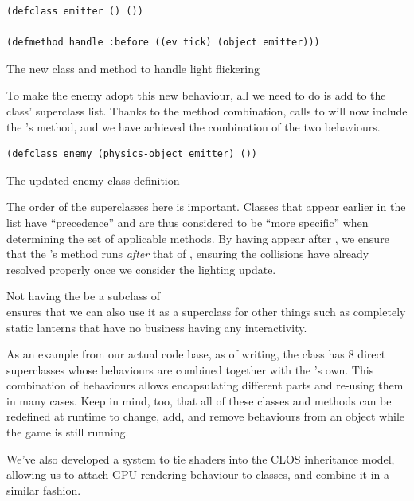 \documentclass[a4paper]{paper}
\begin{document}
\begin{listing}[h]
\begin{verbatim}
(defclass emitter () ())

(defmethod handle :before ((ev tick) (object emitter)))
\end{verbatim}
\caption{The new class and method to handle light flickering}
\label{lst:emitter}
\end{listing}

To make the enemy adopt this new behaviour, all we need to do is add  to the  class' superclass list. Thanks to the method combination, calls to  will now include the 's method, and we have achieved the combination of the two behaviours.

\begin{listing}[H]
\begin{verbatim}
(defclass enemy (physics-object emitter) ())
\end{verbatim}
\caption{The updated enemy class definition}
\label{lst:new-enemy}
\end{listing}

The order of the superclasses here is important. Classes that appear earlier in the list have ``precedence'' and are thus considered to be ``more specific'' when determining the set of applicable methods. By having  appear after , we ensure that the 's  method runs \textit{after} that of , ensuring the collisions have already resolved properly once we consider the lighting update.

Not having the  be a subclass of \\ ensures that we can also use it as a superclass for other things such as completely static lanterns that have no business having any interactivity.

As an example from our actual code base, as of writing, the  class has 8 direct superclasses whose behaviours are combined together with the 's own. This combination of behaviours allows encapsulating different parts and re-using them in many cases. Keep in mind, too, that all of these classes and methods can be redefined at runtime to change, add, and remove behaviours from an object while the game is still running.

We've also developed a system to tie shaders into the CLOS inheritance model, allowing us to attach GPU rendering behaviour to classes, and combine it in a similar fashion\cite{hafner2019shader}.
\end{document}
